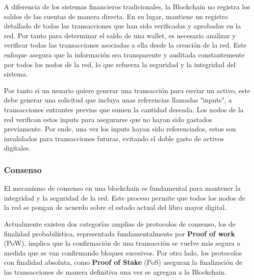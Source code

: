 
A diferencia de los sistemas financieros tradicionales, la Blockchain no registra los saldos de las cuentas de manera directa. En su lugar, mantiene un registro detallado de todas las transacciones que han sido verificadas y aprobadas en la red.
Por tanto para determinar el saldo de una wallet, es necesario analizar y verificar todas las transacciones asociadas a ella desde la creación de la red. Este enfoque asegura que la información sea transparente y auditada constantemente por todos los nodos de la red, lo que refuerza la seguridad y la integridad del sistema.

Por tanto si un usuario quiere generar una transacción para enviar un activo, este debe generar una solicitud que incluya unas referencias llamadas "inputs", a transacciones entrantes previas que sumen la cantidad deseada. Los nodos de la red verifican estos inputs para asegurarse que no hayan sido gastados previamente.
Por ende, una vez los inputs hayan sido referenciados, estos son invalidados para transacciones futuras, evitando el doble gasto de activos digitales.


\subsubsection{Consenso}

El mecanismo de consenso en una blockchain es fundamental para mantener la integridad y la seguridad de la red. Este proceso permite que todos los nodos de la red se pongan de acuerdo sobre el estado actual del libro mayor digital.

Actualmente existen dos categorías amplias de protocolos de consenso, los de finalidad probabilística, representada fundamentalmente por \textbf{Proof of work} (PoW), implica que la confirmación de una transacción se vuelve más segura a medida que se van confirmando bloques sucesivos.
Por otro lado, los protocolos con finalidad absoluta, como \textbf{Proof of Stake} (PoS) aseguran la finalización de las transacciones de manera definitiva una vez se agregan a la Blockchain.

